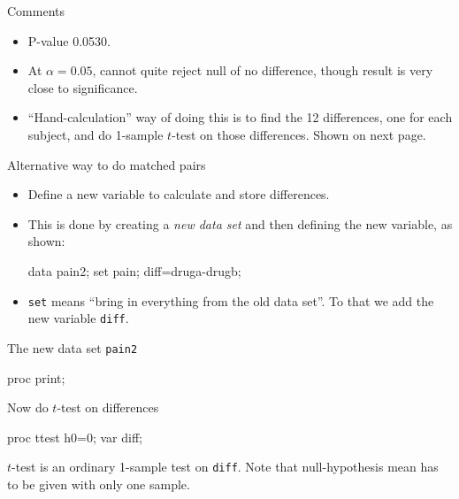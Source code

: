 \documentclass[unknownkeysallowed]{beamer}\usepackage[]{graphicx}\usepackage[]{color}
\begin{document}
\begin{frame}[fragile]{Comments}


  \begin{itemize}
  \item P-value 0.0530. 
  \item At $\alpha=0.05$, cannot quite reject null of no
difference, though result is very close to significance.
\item ``Hand-calculation'' way of doing this is to find the 12
  differences, one for each subject, and do 1-sample $t$-test on those
  differences. Shown on next page.
  \end{itemize}
  
\end{frame}

\begin{frame}[fragile]{Alternative way to do matched pairs}

  \begin{itemize}
  \item Define a new variable to calculate and store differences.
  \item This is done by creating a \emph{new data set} and then
    defining the new variable, as shown:
\begin{Datastep}
data pain2;
  set pain;
  diff=druga-drugb;  
\end{Datastep}

\item \texttt{set} means ``bring in everything from the old data
  set''. To that we add the new variable \texttt{diff}.
  \end{itemize}
  
  
  

\end{frame}

\begin{frame}[fragile]{The new data set \texttt{pain2}}
  \begin{Sascode}[store=iy]
proc print;    
  \end{Sascode}
  
\end{frame}

\begin{frame}[fragile]{Now do $t$-test on differences}


\begin{Sascode}[store=id]
  proc ttest h0=0;
    var diff;
\end{Sascode}


$t$-test is an ordinary 1-sample test on \texttt{diff}. Note that
null-hypothesis mean has to be given with only one sample.


  
\end{frame}
\end{document}
